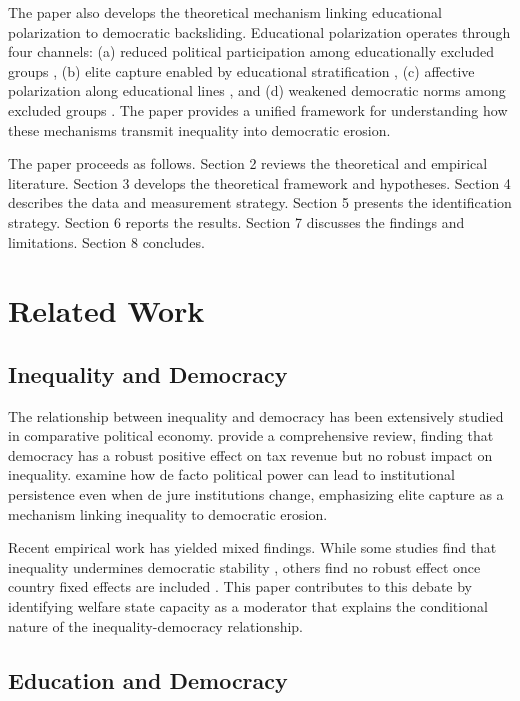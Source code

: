 \documentclass[11pt,letterpaper]{article}
\begin{document}
The paper also develops the theoretical mechanism linking educational polarization to democratic backsliding. Educational polarization operates through four channels: (a) reduced political participation among educationally excluded groups \citep{Glaeser2007, Persson2014}, (b) elite capture enabled by educational stratification \citep{Acemoglu2006}, (c) affective polarization along educational lines \citep{Boxell2021}, and (d) weakened democratic norms among excluded groups \citep{Glaeser2007}. The paper provides a unified framework for understanding how these mechanisms transmit inequality into democratic erosion.

The paper proceeds as follows. Section 2 reviews the theoretical and empirical literature. Section 3 develops the theoretical framework and hypotheses. Section 4 describes the data and measurement strategy. Section 5 presents the identification strategy. Section 6 reports the results. Section 7 discusses the findings and limitations. Section 8 concludes.

\section{Related Work}

\subsection{Inequality and Democracy}

The relationship between inequality and democracy has been extensively studied in comparative political economy. \cite{Acemoglu2019} provide a comprehensive review, finding that democracy has a robust positive effect on tax revenue but no robust impact on inequality. \cite{Acemoglu2006} examine how de facto political power can lead to institutional persistence even when de jure institutions change, emphasizing elite capture as a mechanism linking inequality to democratic erosion.

Recent empirical work has yielded mixed findings. While some studies find that inequality undermines democratic stability \citep{Boix2003, Ansell2014}, others find no robust effect once country fixed effects are included \citep{Acemoglu2008}. This paper contributes to this debate by identifying welfare state capacity as a moderator that explains the conditional nature of the inequality-democracy relationship.

\subsection{Education and Democracy}
\end{document}
